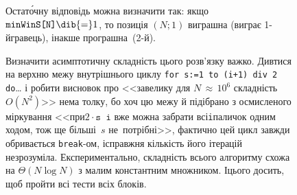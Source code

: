 \begin{figure}[!b]
Остат\'{о}чну відповідь можна визначити так: 
якщо $\texttt{minWinS[N]}\dib{{=}}1$, то позиція $(N;1)$ виграшна 
(виграє \mbox{1-й}\nolinebreak[3] гравець),
інакше програшна~(\mbox{2-й}).

Визначити асимптотичну складність цього розв'язку важко. Дивтися на верхню межу внутрішнього циклу \texttt{for s:=1 to (i+1) div 2 do}\dots{} і робити висновок про <<завелику для ${N\,{\approx}\,10^6}$ складність~$O(N^2)$>> нема толку, бо хоч цю межу й підібрано з осмисленого міркування <<при\nolinebreak[2] $2{\cdot}\texttt{s}\,{\>}\,\texttt{i}$ вже можна забрати всі\nolinebreak[2] \texttt{i}\nolinebreak[2] паличок одним ходом, тож ще більші~$s$ не~потрібні>>, фактично цей цикл завжди обривається \texttt{break}-ом, і\nolinebreak[3] справжня кількість його ітерацій незрозуміла.
Експериментально, складність всього алгоритму схожа на $\Theta(N\log{}N)$ з малим константним множником. І\nolinebreak[3] цього досить, щоб пройти всі тести всіх блоків.




\end{figure}
